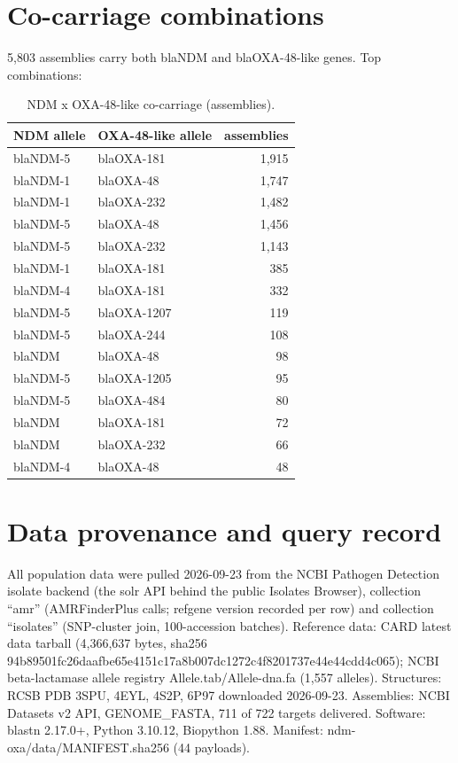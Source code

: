 \section{Co-carriage combinations}
5,803 assemblies carry both blaNDM and blaOXA-48-like genes. Top combinations:
\begin{longtable}{llr}
\caption{NDM x OXA-48-like co-carriage (assemblies).}\\
\textbf{NDM allele}&\textbf{OXA-48-like allele}&\textbf{assemblies}\\\hline
\endhead
blaNDM-5&blaOXA-181&1,915\\
blaNDM-1&blaOXA-48&1,747\\
blaNDM-1&blaOXA-232&1,482\\
blaNDM-5&blaOXA-48&1,456\\
blaNDM-5&blaOXA-232&1,143\\
blaNDM-1&blaOXA-181&385\\
blaNDM-4&blaOXA-181&332\\
blaNDM-5&blaOXA-1207&119\\
blaNDM-5&blaOXA-244&108\\
blaNDM&blaOXA-48&98\\
blaNDM-5&blaOXA-1205&95\\
blaNDM-5&blaOXA-484&80\\
blaNDM&blaOXA-181&72\\
blaNDM&blaOXA-232&66\\
blaNDM-4&blaOXA-48&48\\
\hline\end{longtable}
\section{Data provenance and query record}
All population data were pulled 2026-09-23 from the NCBI Pathogen Detection isolate backend (the solr API behind the public Isolates Browser), collection ``amr'' (AMRFinderPlus calls; refgene version recorded per row) and collection ``isolates'' (SNP-cluster join, 100-accession batches). Reference data: CARD latest data tarball (4,366,637 bytes, sha256 94b89501fc26daafbe65e4151c17a8b007dc1272c4f8201737e44e44cdd4c065); NCBI beta-lactamase allele registry Allele.tab/Allele-dna.fa (1,557 alleles). Structures: RCSB PDB 3SPU, 4EYL, 4S2P, 6P97 downloaded 2026-09-23. Assemblies: NCBI Datasets v2 API, GENOME\_FASTA, 711 of 722 targets delivered. Software: blastn 2.17.0+, Python 3.10.12, Biopython 1.88. Manifest: ndm-oxa/data/MANIFEST.sha256 (44 payloads).
